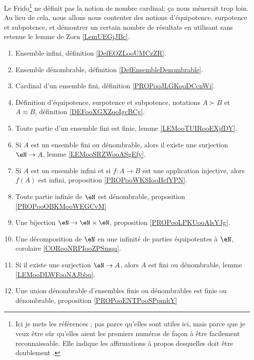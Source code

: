 	\label{THEMEooCardinalite}
Le Frido\footnote{Ici je mets les références \cite{MonCerveau,BIBooMistral,BIBChatGPT,BIBChatGPTDifficile}; pas parce qu'elles sont utiles ici, mais parce que je veux être sûr qu'elles aient les premiers numéros de façon à être facilement reconnaissable. Elle indique les affirmations à propos desquelles  doit être doublement .} ne définit pas la notion de nombre cardinal; ça nous mènerait trop loin. Au lieu de cela, nous allons nous contenter des notions d'équipotence, surpotence et subpotence, et démontrer un certain nombre de résultats en utilisant sans retenue le lemme de Zorn \ref{LemUEGjJBc}.
\begin{enumerate}
	\item
	      Ensemble infini, définition \ref{DefEOZLooUMCzZR}.
	\item
	      Ensemble dénombrable, définition \ref{DefEnsembleDenombrable}.
	\item
	      Cardinal d'un ensemble fini, définition \ref{PROPooJLGKooDCcnWi}.
	\item
	      Définition d'équipotence, surpotence et subpotence, notations \( A\succ B\) et \( A\approx B\), définition \ref{DEFooXGXZooIgcBCg}.
	\item
	      Toute partie d'un ensemble fini est finie, lemme \ref{LEMooTUIRooEXjfDY}.
	\item
	      Si \( A\) est un ensemble fini ou dénombrable, alors il existe une surjection \( \eN\to A\), lemme \ref{LEMooSRZWooASgEfy}.
	\item
	      Si \( A\) est un ensemble infini et si \( f\colon A\to B\) est une application injective, alors \( f(A)\) est infini, proposition \ref{PROPooWKSIooHcfYPN}.
	\item
	      Toute partie infinie de \( \eN\) est dénombrable, proposition \ref{PROPooOBKMooWEGCvM}
	\item
	      Une bijection \( \eN\to \eN\times \eN\), proposition \ref{PROPooLPKUooAlsYJg}.
	\item
	      Une décomposition de \( \eN\) en une infinité de parties équipotentes à \( \eN\), corolaire \ref{CORooNRPIooZPSmqa}.
	\item
	      Si il existe une surjection \( \eN\to A\), alors \( A\) est fini ou dénombrable, lemme \ref{LEMooDLWFooNAJbbq}.
	\item
	      Une union dénombrable d'ensembles finis ou dénombrables est finie ou dénombrable, proposition \ref{PROPooENTPooSPpmhY}

\end{enumerate}
